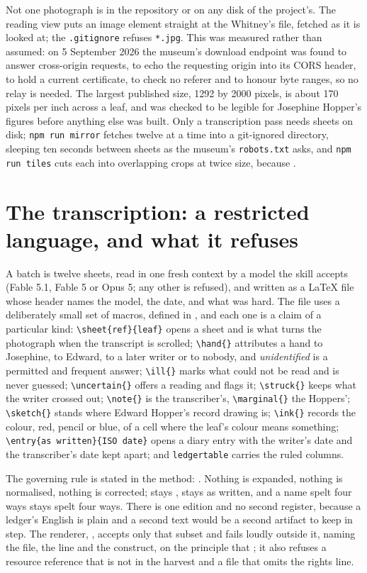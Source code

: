 Not one photograph is in the repository or on any disk of the project's. The reading view puts an image element straight at the Whitney's file, fetched as it is looked at; the \texttt{.gitignore} refuses \texttt{*.jpg}. This was measured rather than assumed: on 5 September 2026 the museum's download endpoint was found to answer cross-origin requests, to echo the requesting origin into its CORS header, to hold a current certificate, to check no referer and to honour byte ranges, so no relay is needed. The largest published size, 1292 by 2000 pixels, is about 170 pixels per inch across a leaf, and was checked to be legible for Josephine Hopper's figures before anything else was built. Only a transcription pass needs sheets on disk; \texttt{npm run mirror} fetches twelve at a time into a git-ignored directory, sleeping ten seconds between sheets as the museum's \texttt{robots.txt} asks, and \texttt{npm run tiles} cuts each into overlapping crops at twice size, because .

\section{The transcription: a restricted language, and what it refuses}

A batch is twelve sheets, read in one fresh context by a model the skill accepts (Fable 5.1, Fable 5 or Opus 5; any other is refused), and written as a LaTeX file whose header names the model, the date, and what was hard. The file uses a deliberately small set of macros, defined in , and each one is a claim of a particular kind: \verb|\sheet{ref}{leaf}| opens a sheet and is what turns the photograph when the transcript is scrolled; \verb+\hand{}+ attributes a hand to Josephine, to Edward, to a later writer or to nobody, and \emph{unidentified} is a permitted and frequent answer; \verb|\ill{}| marks what could not be read and is never guessed; \verb|\uncertain{}| offers a reading and flags it; \verb|\struck{}| keeps what the writer crossed out; \verb|\note{}| is the transcriber's, \verb|\marginal{}| the Hoppers'; \verb|\sketch{}| stands where Edward Hopper's record drawing is; \verb+\ink{}+ records the colour, red, pencil or blue, of a cell where the leaf's colour means something; \verb|\entry{as written}{ISO date}| opens a diary entry with the writer's date and the transcriber's date kept apart; and \verb|ledgertable| carries the ruled columns.

The governing rule is stated in the method: . Nothing is expanded, nothing is normalised, nothing is corrected;  stays ,  stays as written, and a name spelt four ways stays spelt four ways. There is one edition and no second register, because a ledger's English is plain and a second text would be a second artifact to keep in step. The renderer, , accepts only that subset and fails loudly outside it, naming the file, the line and the construct, on the principle that ; it also refuses a resource reference that is not in the harvest and a file that omits the rights line.


